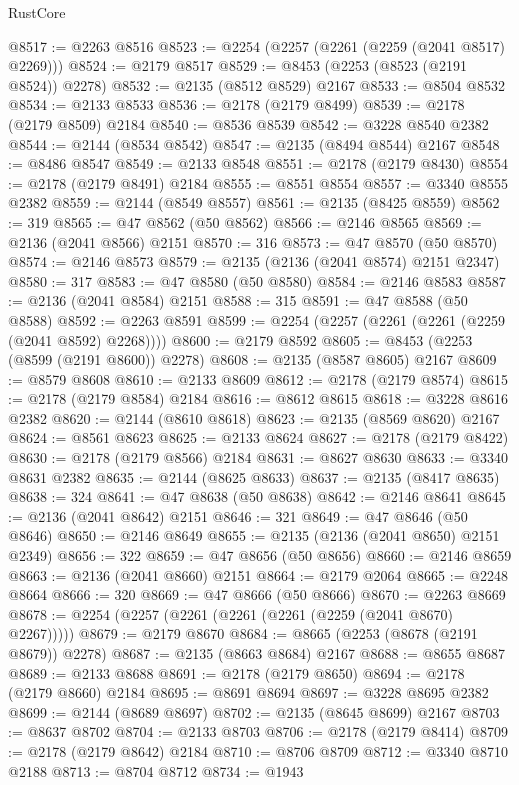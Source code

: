 \begin{lexlean}{RustCore}
\begin{coremodule}
@8517 := @2263 @8516
@8523 := @2254 (@2257 (@2261 (@2259 (@2041 @8517) @2269)))
@8524 := @2179 @8517
@8529 := @8453 (@2253 (@8523 (@2191 @8524)) @2278)
@8532 := @2135 (@8512 @8529) @2167
@8533 := @8504 @8532
@8534 := @2133 @8533
@8536 := @2178 (@2179 @8499)
@8539 := @2178 (@2179 @8509) @2184
@8540 := @8536 @8539
@8542 := @3228 @8540 @2382
@8544 := @2144 (@8534 @8542)
@8547 := @2135 (@8494 @8544) @2167
@8548 := @8486 @8547
@8549 := @2133 @8548
@8551 := @2178 (@2179 @8430)
@8554 := @2178 (@2179 @8491) @2184
@8555 := @8551 @8554
@8557 := @3340 @8555 @2382
@8559 := @2144 (@8549 @8557)
@8561 := @2135 (@8425 @8559)
@8562 := 319
@8565 := @47 @8562 (@50 @8562)
@8566 := @2146 @8565
@8569 := @2136 (@2041 @8566) @2151
@8570 := 316
@8573 := @47 @8570 (@50 @8570)
@8574 := @2146 @8573
@8579 := @2135 (@2136 (@2041 @8574) @2151 @2347)
@8580 := 317
@8583 := @47 @8580 (@50 @8580)
@8584 := @2146 @8583
@8587 := @2136 (@2041 @8584) @2151
@8588 := 315
@8591 := @47 @8588 (@50 @8588)
@8592 := @2263 @8591
@8599 := @2254 (@2257 (@2261 (@2261 (@2259 (@2041 @8592) @2268))))
@8600 := @2179 @8592
@8605 := @8453 (@2253 (@8599 (@2191 @8600)) @2278)
@8608 := @2135 (@8587 @8605) @2167
@8609 := @8579 @8608
@8610 := @2133 @8609
@8612 := @2178 (@2179 @8574)
@8615 := @2178 (@2179 @8584) @2184
@8616 := @8612 @8615
@8618 := @3228 @8616 @2382
@8620 := @2144 (@8610 @8618)
@8623 := @2135 (@8569 @8620) @2167
@8624 := @8561 @8623
@8625 := @2133 @8624
@8627 := @2178 (@2179 @8422)
@8630 := @2178 (@2179 @8566) @2184
@8631 := @8627 @8630
@8633 := @3340 @8631 @2382
@8635 := @2144 (@8625 @8633)
@8637 := @2135 (@8417 @8635)
@8638 := 324
@8641 := @47 @8638 (@50 @8638)
@8642 := @2146 @8641
@8645 := @2136 (@2041 @8642) @2151
@8646 := 321
@8649 := @47 @8646 (@50 @8646)
@8650 := @2146 @8649
@8655 := @2135 (@2136 (@2041 @8650) @2151 @2349)
@8656 := 322
@8659 := @47 @8656 (@50 @8656)
@8660 := @2146 @8659
@8663 := @2136 (@2041 @8660) @2151
@8664 := @2179 @2064
@8665 := @2248 @8664
@8666 := 320
@8669 := @47 @8666 (@50 @8666)
@8670 := @2263 @8669
@8678 := @2254 (@2257 (@2261 (@2261 (@2261 (@2259 (@2041 @8670) @2267)))))
@8679 := @2179 @8670
@8684 := @8665 (@2253 (@8678 (@2191 @8679)) @2278)
@8687 := @2135 (@8663 @8684) @2167
@8688 := @8655 @8687
@8689 := @2133 @8688
@8691 := @2178 (@2179 @8650)
@8694 := @2178 (@2179 @8660) @2184
@8695 := @8691 @8694
@8697 := @3228 @8695 @2382
@8699 := @2144 (@8689 @8697)
@8702 := @2135 (@8645 @8699) @2167
@8703 := @8637 @8702
@8704 := @2133 @8703
@8706 := @2178 (@2179 @8414)
@8709 := @2178 (@2179 @8642) @2184
@8710 := @8706 @8709
@8712 := @3340 @8710 @2188
@8713 := @8704 @8712
@8734 := @1943

\end{coremodule}
\end{lexlean}
